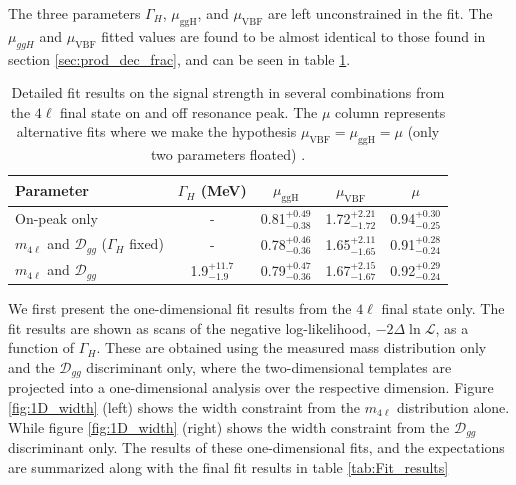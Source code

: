 The three parameters $\Gamma_{H}$, $\mu_{\text{ggH}}$, and $\mu_\mathrm{VBF}$ are left unconstrained in the fit. The $\mu_{ggH}$ and $\mu_\mathrm{VBF}$ fitted values are found to be almost identical to those found in section \ref{sec:prod_dec_frac}, and can be seen in table \ref{tab:fitresults}. 

\begin{table}[htb]
\begin{center}
\begin{tabular}{l|ccc|c}
\hline
Parameter & $\Gamma_H$ (MeV) & $\mu_{\mathrm{ggH}}$ & $\mu_{\mathrm{VBF}}$ & $\mu$\\
\hline
On-peak only & - & 0.81$_{-0.38}^{+0.49}$ & 1.72$_{-1.72}^{+2.21}$ & 0.94$_{-0.25}^{+0.30}$ \\
\hline
$m_{4\ell}$ and $\mathcal{D}_{gg}$ ($\Gamma_H$ fixed) & - & 0.78$_{-0.36}^{+0.46}$ & 1.65$_{-1.65}^{+2.11}$ & 0.91$_{-0.24}^{+0.28}$ \\
$m_{4\ell}$ and $\mathcal{D}_{gg}$ & 1.9$_{-1.9}^{+11.7}$ & 0.79$_{-0.36}^{+0.47}$ & 1.67$_{-1.67}^{+2.15}$ & 0.92$_{-0.24}^{+0.29}$ \\
\hline
\end{tabular}
\caption[Detailed fit results on the signal strength in several combinations from the $4\ell$ final state on and off resonance peak. The $\mu$ column represents alternative fits where we make the hypothesis $\mu_\text{VBF} = \mu_\text{ggH} = \mu$ (only two parameters floated).]{Detailed fit results on the signal strength in several combinations from the $4\ell$ final state on and off resonance peak. The $\mu$ column represents alternative fits where we make the hypothesis $\mu_\text{VBF} = \mu_\text{ggH} = \mu$ (only two parameters floated) \cite{CMS_AN_2014_018}.} 
\label{tab:fitresults}
\end{center}
\end{table}

We first present the one-dimensional fit results from the $4\ell$ final state only. The fit results are shown as scans of the negative
log-likelihood, $-2 \Delta \ln\mathcal{L}$, as a function of $\Gamma_{H}$. These are obtained using the measured mass distribution only and the $\mathcal{D}_{gg}$ discriminant only, where the two-dimensional templates are projected into a one-dimensional analysis over the respective dimension. Figure \ref{fig:1D_width} (left) shows the width constraint from the $m_{4\ell}$ distribution alone. While figure \ref{fig:1D_width} (right) shows the width constraint from the $\mathcal{D}_{gg}$ discriminant only. The results of these one-dimensional fits, and the expectations are summarized along with the final fit results in table \ref{tab:Fit_results}

